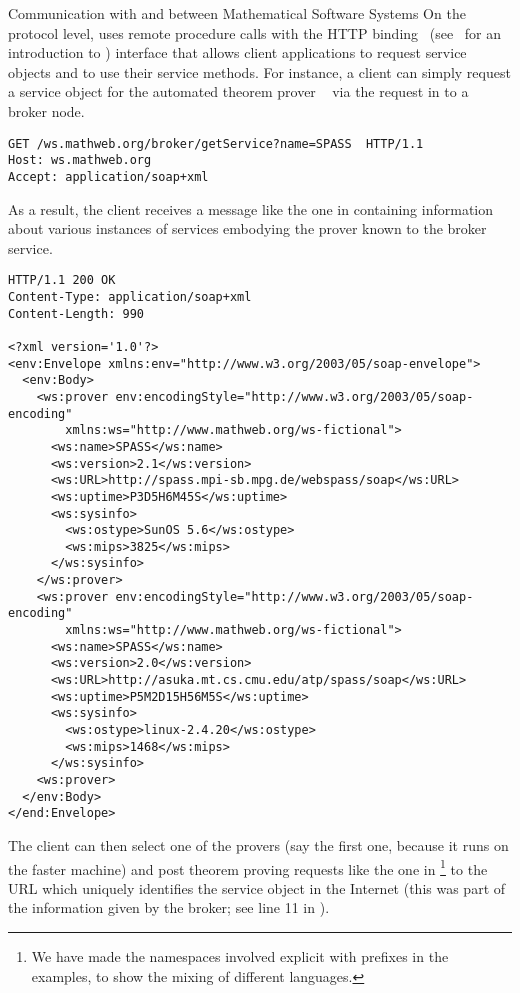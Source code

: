 \begin{tchapter}[id=rpc,short=Communication between Systems]{Communication with and between Mathematical Software Systems}
On the protocol level, {\mathwebws} uses {\soap} remote procedure calls with the HTTP
binding~\cite{GudHad:soapad03} (see~\cite{Mitra:soapPrimer03} for an introduction to
{\soap}) interface that allows client applications to request service objects and to use
their service methods. For instance, a client can simply request a service object for the
automated theorem prover {\spass}~\cite{Weidenbach:sv97} via the {\http} {}
request in {} to a {\mathwebws} broker node.

\begin{lstlisting}[label=lst:discover-spass,
          caption={Discovering Automated Theorem Provers (Request)}]
GET /ws.mathweb.org/broker/getService?name=SPASS  HTTP/1.1
Host: ws.mathweb.org
Accept: application/soap+xml
\end{lstlisting}

As a result, the client receives a {\soap} message like the one in
{} containing information about various instances of
services embodying the {\spass} prover known to the broker service.

\begin{lstlisting}[label=lst:rpc-spass,
          caption={Discovering Automated Theorem Provers (Response)}]
HTTP/1.1 200 OK
Content-Type: application/soap+xml
Content-Length: 990

<?xml version='1.0'?>
<env:Envelope xmlns:env="http://www.w3.org/2003/05/soap-envelope">
  <env:Body>
    <ws:prover env:encodingStyle="http://www.w3.org/2003/05/soap-encoding"
        xmlns:ws="http://www.mathweb.org/ws-fictional">
      <ws:name>SPASS</ws:name>
      <ws:version>2.1</ws:version>
      <ws:URL>http://spass.mpi-sb.mpg.de/webspass/soap</ws:URL>
      <ws:uptime>P3D5H6M45S</ws:uptime>
      <ws:sysinfo>
        <ws:ostype>SunOS 5.6</ws:ostype>
        <ws:mips>3825</ws:mips>
      </ws:sysinfo>
    </ws:prover>
    <ws:prover env:encodingStyle="http://www.w3.org/2003/05/soap-encoding"
        xmlns:ws="http://www.mathweb.org/ws-fictional">
      <ws:name>SPASS</ws:name>
      <ws:version>2.0</ws:version>
      <ws:URL>http://asuka.mt.cs.cmu.edu/atp/spass/soap</ws:URL>
      <ws:uptime>P5M2D15H56M5S</ws:uptime>
      <ws:sysinfo>
        <ws:ostype>linux-2.4.20</ws:ostype>
        <ws:mips>1468</ws:mips>
      </ws:sysinfo>
    <ws:prover>
  </env:Body>
</end:Envelope>
\end{lstlisting}

The client can then select one of the provers (say the first one, because it runs
on the faster machine) and post theorem proving requests like the one in
{}\footnote{We have made the namespaces involved explicit
  with prefixes in the examples, to show the mixing of different {\xml}
  languages.} to the URL which uniquely identifies the service object in the
Internet (this was part of the information given by the broker; see line 11 in
{}).


\end{tchapter}
